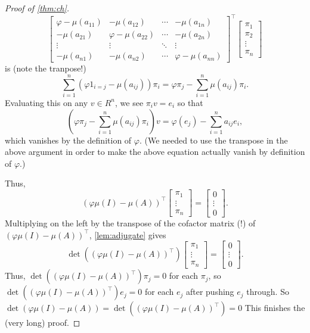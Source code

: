 \begin{proof}[Proof of \autoref{thm:ch}]
	\[\begin{bmatrix}
		\varphi-\mu(a_{11}) & -\mu(a_{12}) & \cdots & -\mu(a_{1n}) \\
		-\mu(a_{21}) & \varphi-\mu(a_{22}) & \cdots & -\mu(a_{2n}) \\
		\vdots & \vdots & \ddots & \vdots \\
		-\mu(a_{n1}) & -\mu(a_{n2}) & \cdots & \varphi-\mu(a_{nn})
	\end{bmatrix}^\intercal\begin{bmatrix}
		\pi_1 \\
		\pi_2 \\
		\vdots \\
		\pi_n
	\end{bmatrix}\]
	is (note the tranpose!)
	\[\sum_{i=1}^n(\varphi1_{i=j}-\mu(a_{ij}))\pi_i=\varphi\pi_j-\sum_{i=1}^n\mu(a_{ij})\pi_i.\]
	Evaluating this on any $v\in R^n$, we see $\pi_iv=e_i$ so that
	\[\left(\varphi\pi_j-\sum_{i=1}^n\mu(a_{ij})\pi_i\right)v=\varphi(e_j)-\sum_{i=1}^na_{ij}e_i,\]
	which vanishes by the definition of $\varphi$. (We needed to use the transpose in the above argument in order to make the above equation actually vanish by definition of $\varphi$.)

	Thus,
	\[(\varphi\mu(I)-\mu(A))^\intercal\begin{bmatrix}
		\pi_1 \\
		\vdots \\
		\pi_n
	\end{bmatrix}=\begin{bmatrix}
		0 \\
		\vdots \\
		0
	\end{bmatrix}.\]
	Multiplying on the left by the transpose of the cofactor matrix (!) of $(\varphi\mu(I)-\mu(A))^\intercal$, \autoref{lem:adjugate} gives
	\[\det\left((\varphi\mu(I)-\mu(A))^\intercal\right)\begin{bmatrix}
		\pi_1 \\
		\vdots \\
		\pi_n
	\end{bmatrix}=\begin{bmatrix}
		0 \\
		\vdots \\
		0
	\end{bmatrix}.\]
	Thus, $\det\left((\varphi\mu(I)-\mu(A))^\intercal\right)\pi_j=0$ for each $\pi_j$, so $\det\left((\varphi\mu(I)-\mu(A))^\intercal\right)e_j=0$ for each $e_j$ after pushing $e_j$ through. So $\det(\varphi\mu(I)-\mu(A))=\det\left((\varphi\mu(I)-\mu(A))^\intercal\right)=0$ This finishes the (very long) proof.
\end{proof}

